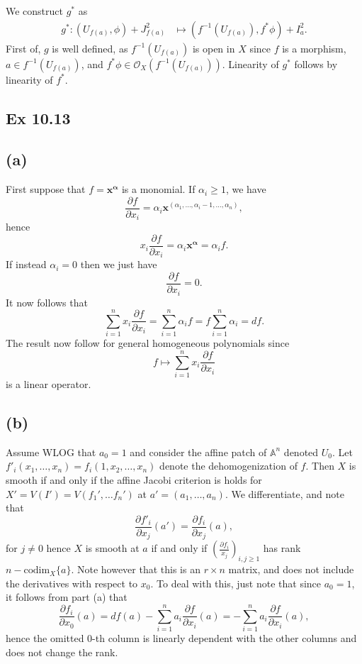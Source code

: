 \documentclass{article}
\theoremstyle{definition}
\newcommand{\A}{\mathbb{A}}
\renewcommand{\AA}[1]{\A^{#1}}
\newcommand{\codim}{\text{codim}}
\begin{document}
We construct $g^*$ as 
\begin{align*}
	g^* :
	\left(U_{f(a)}, \phi\right) + J_{f(a)}^{2}
	&\mapsto
	(f^{-1}\left(U_{f(a)}\right), f^* \phi) + I_{a}^{2}.
\end{align*}
First of, $g$ is well defined, as $f^{-1}(U_{f(a)})$ is open in $X$ since $f$
is a morphism, $a \in f^{-1}(U_{f(a)})$, and $f^{*} \phi \in
\mathcal{O}_X(f^{-1}(U_{f(a)}))$. Linearity of $g^*$ follows by linearity of
$f^{*}$. \\

\subsection*{Ex 10.13}

\subsection*{(a)}

First suppose that $f = \bm{x}^{\bm{\alpha}}$ is a monomial.
If $\alpha_i \geq 1$, we have
\[
	\frac{\partial f}{\partial x_i} = \alpha_i \bm{x}^{(\alpha_1, \ldots, \alpha_i - 1, \ldots, \alpha_n)},
\]
hence 
\[
	x_i \frac{\partial f}{\partial x_i} = \alpha_i \bm{x}^{\bm{\alpha}} = \alpha_i f.
\]
If instead $\alpha_i = 0$ then we just have
\[
	\frac{\partial f}{\partial x_i} = 0.
\]
It now follows that  
\[
	\sum_{i = 1}^{n}
	x_i \frac{\partial f}{\partial x_i}
	=
	\sum_{i = 1}^{n}
	\alpha_i f	
	=
	f
	\sum_{i = 1}^{n}
	\alpha_i
	=
	d f.
\] 
The result now follow for general homogeneous polynomials since 
\[
	f \mapsto
	\sum_{i = 1}^{n}
	x_i \frac{\partial f}{\partial x_i}
\] 
is a linear operator.


\subsection*{(b)}

Assume WLOG that $a_0 = 1$ and consider the affine patch of $\AA{n}$ denoted
$U_0$. Let $f'_i(x_1, \ldots, x_n) = f_i(1, x_2, \ldots, x_n)$ denote the
dehomogenization of $f$. Then $X$ is smooth if and only if the affine Jacobi
criterion is holds for $X' = V(I') = V(f_1', \ldots f_n')$ at $a' = (a_1,
\ldots, a_n)$. We differentiate, and note that 
\[
	\frac{\partial f'_i}{\partial x_j}(a')
	=
	\frac{\partial f_i}{\partial x_j}(a),
\] 
for $j \not = 0$ hence $X$ is smooth at $a$ if and only if
$\left(\frac{\partial f_i}{x_j}\right)_{i, j \geq 1}$ has rank $n -
\codim_X\{a\}$. Note however that this is an $r \times n$ matrix, and does not
include the derivatives with respect to $x_0$. To deal with this, just note
that since $a_0 = 1$, it follows from part (a) that
\[
	\frac{\partial f_i}{\partial x_0}(a)
	=
	d f(a)
	-
	\sum_{i = 1}^{n}
	a_i \frac{\partial f}{\partial x_i}(a)
	=
	-
	\sum_{i = 1}^{n}
	a_i \frac{\partial f}{\partial x_i}(a),
\] 
hence the omitted $0$-th column is linearly dependent with the other columns
and does not change the rank.
\end{document}
